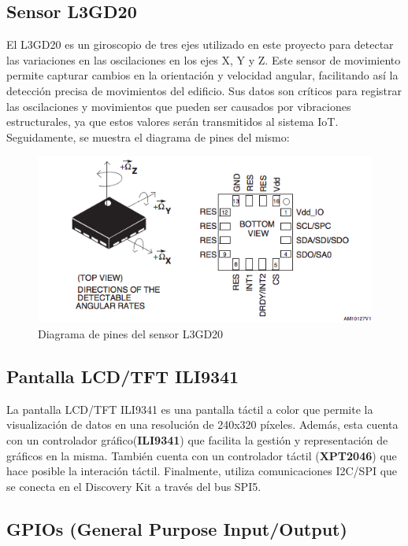 \documentclass[12pt,a4paper]{article}
\begin{document}
\subsection{Sensor L3GD20}
El L3GD20\cite{sensor} es un giroscopio de tres ejes utilizado en este proyecto para detectar las variaciones en las oscilaciones en los ejes X, Y y Z. Este sensor de movimiento permite capturar cambios en la orientación y velocidad angular, facilitando así la detección precisa de movimientos del edificio. Sus datos son críticos para registrar las oscilaciones y movimientos que pueden ser causados por vibraciones estructurales, ya que estos valores serán transmitidos al sistema IoT. Seguidamente, se muestra el diagrama de pines del mismo:
\begin{figure}[H]
    \centering
    \includegraphics[width=0.9\linewidth]{Imagenes/sensor.png}
    \caption{Diagrama de pines del sensor L3GD20\cite{sensor}}
    \label{fig:1}
\end{figure}

\subsection{Pantalla LCD/TFT ILI9341}
La pantalla  LCD/TFT ILI9341 \cite{hoja} es una pantalla táctil a color que permite la visualización de datos en una resolución de 240x320 píxeles. Además, esta cuenta con un controlador gráfico(\textbf{ILI9341}) que facilita la gestión y representación de gráficos en la misma. También cuenta con un controlador táctil (\textbf{XPT2046}) que hace posible la interación táctil. Finalmente, utiliza comunicaciones I2C/SPI que se conecta en el Discovery Kit a través del bus SPI5.

\subsection{GPIOs (General Purpose Input/Output)}
\end{document}
